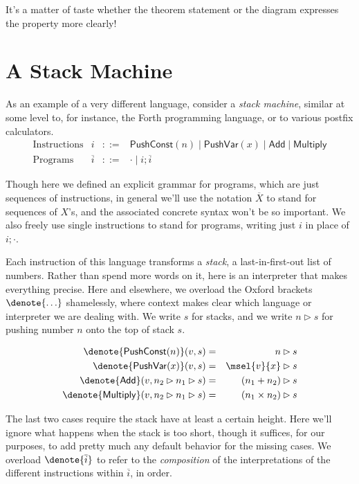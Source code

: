 \documentclass{amsbook}
\theoremstyle{definition}
\theoremstyle{remark}
\numberwithin{section}{chapter}
\numberwithin{equation}{chapter}
\begin{document}
It's a matter of taste whether the theorem statement or the diagram expresses the property more clearly!

\section{A Stack Machine}

As an example of a very different language, consider a \emph{stack machine}, similar at some level to, for instance, the Forth programming language, or to various postfix calculators.
\encoding
$$\begin{array}{rrcl}
  \textrm{Instructions} & i &::=& \mathsf{PushConst}(n) \mid \mathsf{PushVar}(x) \mid \mathsf{Add} \mid \mathsf{Multiply} \\
  \textrm{Programs} & \overline{i} &::=& \cdot \mid i; \overline{i}
\end{array}$$

Though here we defined an explicit grammar for programs, which are just sequences of instructions, in general we'll use the notation $\overline{X}$ to stand for sequences of $X$'s, and the associated concrete syntax won't be so important.
We also freely use single instructions to stand for programs, writing just $i$ in place of $i; \cdot$.

\newcommand{\push}[2]{#1 \rhd #2}

Each instruction of this language transforms a \emph{stack}, a last-in-first-out list of numbers.
Rather than spend more words on it, here is an interpreter that makes everything precise.
Here and elsewhere, we overload the Oxford brackets $\denote{\ldots}$ shamelessly, where context makes clear which language or interpreter we are dealing with.
We write $s$ for stacks, and we write $\push{n}{s}$ for pushing number $n$ onto the top of stack $s$.

\encoding
\begin{eqnarray*}
  \denote{\mathsf{PushConst}(n)}(v,s) &=& \push{n}{s} \\
  \denote{\mathsf{PushVar}(x)}(v,s) &=& \push{\msel{v}{x}}{s} \\
  \denote{\mathsf{Add}}(v,\push{n_2}{\push{n_1}{s}}) &=& \push{(n_1 + n_2)}{s} \\
  \denote{\mathsf{Multiply}}(v,\push{n_2}{\push{n_1}{s}}) &=& \push{(n_1 \times n_2)}{s}
\end{eqnarray*}

The last two cases require the stack have at least a certain height.
Here we'll ignore what happens when the stack is too short, though it suffices, for our purposes, to add pretty much any default behavior for the missing cases.
We overload $\denote{\overline{i}}$ to refer to the \emph{composition} of the interpretations of the different instructions within $\overline{i}$, in order.
\end{document}
